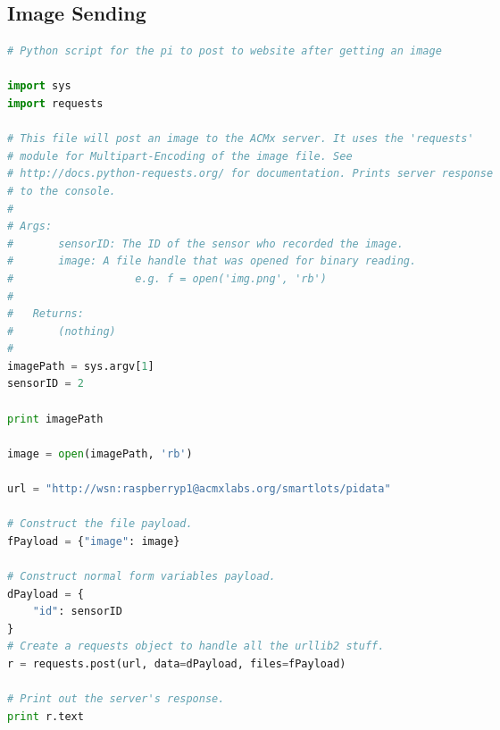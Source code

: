 \documentclass[11pt, oneside, fullpage, doublespace]{article}
\begin{document}
\subsection*{Image Sending}
\begin{spacing}{1}
\begin{lstlisting}[language=python]
# Python script for the pi to post to website after getting an image

import sys
import requests

# This file will post an image to the ACMx server. It uses the 'requests'
# module for Multipart-Encoding of the image file. See 
# http://docs.python-requests.org/ for documentation. Prints server response
# to the console.
# 
# Args:
#		sensorID: The ID of the sensor who recorded the image.
#		image: A file handle that was opened for binary reading.
#					e.g. f = open('img.png', 'rb')
#
#	Returns:
#		(nothing)
#
imagePath = sys.argv[1]
sensorID = 2

print imagePath

image = open(imagePath, 'rb')

url = "http://wsn:raspberryp1@acmxlabs.org/smartlots/pidata"

# Construct the file payload.
fPayload = {"image": image}

# Construct normal form variables payload.
dPayload = {
	"id": sensorID
}
# Create a requests object to handle all the urllib2 stuff.
r = requests.post(url, data=dPayload, files=fPayload)

# Print out the server's response.
print r.text
\end{lstlisting}
\end{spacing}
\end{document}
